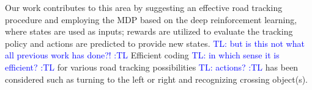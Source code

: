 \documentclass{svproc}
\newcommand{\tl}[1]{\textcolor{blue} {TL: #1 :TL} }
\begin{document}

Our work contributes to this area by suggesting an effective road tracking procedure and employing the MDP based on the deep reinforcement learning, where states are used as inputs; rewards are utilized to evaluate the tracking policy and actions are predicted to provide new states. \tl{but is this not what all previous work has done?!} Efficient coding \tl{in which sense it is efficient?} for various road tracking possibilities \tl{actions?} has been considered such as turning to the left or right and recognizing crossing object(s). 

\end{document}
